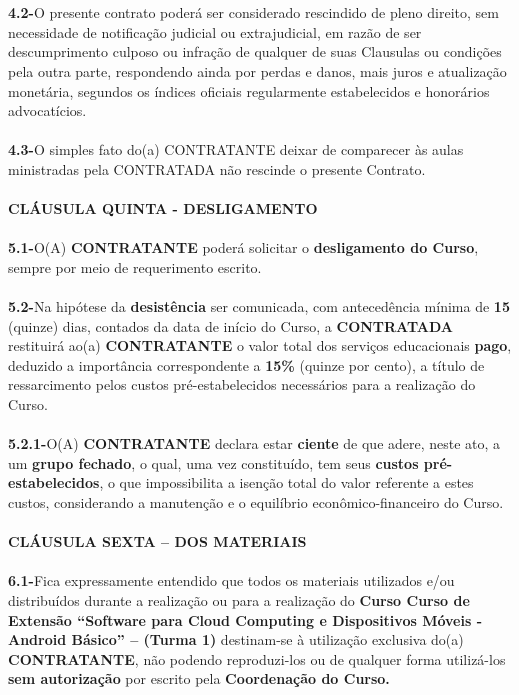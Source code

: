 \documentclass[a4paper,7.5pt]{article}
\newcommand{\thecourse}{``Software para Cloud Computing e Dispositivos Móveis - Android Básico''}
\begin{document}
\\\\
{\bf4.2-}\indent O presente contrato poderá ser considerado rescindido de pleno direito, sem necessidade de notificação judicial ou extrajudicial, em razão de ser descumprimento culposo ou infração de qualquer de suas Clausulas ou condições pela outra parte, respondendo ainda por perdas e danos, mais juros e atualização monetária, segundos os índices oficiais regularmente estabelecidos e honorários advocatícios.
\\\\
{\bf4.3-}\indent O simples fato do(a) CONTRATANTE deixar de comparecer às aulas ministradas pela CONTRATADA não rescinde o presente Contrato.
\\\\
{\bf CLÁUSULA QUINTA - DESLIGAMENTO}
\\\\
{\bf5.1-}\indent O(A) {\bf CONTRATANTE} poderá solicitar o {\bf desligamento do Curso}, sempre por meio de requerimento escrito.
\\\\
{\bf5.2-}\indent Na hipótese da {\bf desistência} ser comunicada, com antecedência mínima de {\bf15} (quinze) dias, contados da data de início do Curso, a {\bf CONTRATADA} restituirá ao(a) {\bf CONTRATANTE} o valor total dos serviços educacionais {\bf pago}, deduzido a importância correspondente a {\bf15\% }(quinze por cento), a título de ressarcimento pelos custos pré-estabelecidos necessários para a realização do Curso.
\\\\
{\bf5.2.1-}\indent O(A) {\bf CONTRATANTE} declara estar {\bf ciente} de que adere, neste ato, a um {\bf grupo fechado}, o qual, uma vez constituído, tem seus {\bf custos pré-estabelecidos}, o que impossibilita a isenção total do valor referente a estes custos, considerando a manutenção e o equilíbrio econômico-financeiro do Curso.
\\\\
{\bf CLÁUSULA SEXTA – DOS MATERIAIS}
\\\\
{\bf6.1-}\indent Fica expressamente entendido que todos os materiais utilizados e/ou distribuídos durante a realização ou para a realização do {\bf Curso Curso de Extensão \thecourse{} – (Turma 1)} destinam-se à utilização exclusiva do(a) {\bf CONTRATANTE}, não podendo reproduzi-los ou de qualquer forma utilizá-los {\bf sem autorização} por escrito pela {\bf Coordenação do Curso.}
\\\\
\end{document}
